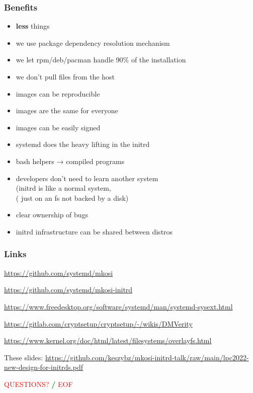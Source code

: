 \documentclass[]{beamer}
\newcommand\pp\pause
\begin{document}
\begin{frame}
  \frametitle{Benefits}

  \begin{itemize}
  \item \textbf{less} things
    \pp
  \item we use package dependency resolution mechanism
    \pp
  \item we let rpm/deb/pacman handle 90\% of the installation
    \pp
  \item we don't pull files from the host
    \pp
  \item images can be reproducible
    \pp
  \item images are the same for everyone
    \pp
  \item images can be easily signed
    \pp
  \item systemd does the heavy lifting in the initrd
    \pp
  \item bash helpers → compiled programs
    \pp
  \item developers don't need to learn another system\\
    (initrd is like a normal system,\\
    \phantom( just on an fs not backed by a disk)
    \pp
  \item clear ownership of bugs
    \pp
  \item initrd infrastructure can be shared between distros
  \end{itemize}
\end{frame}




\begin{frame}[fragile]
  \frametitle{Links}

  \url{https://github.com/systemd/mkosi}

  \url{https://github.com/systemd/mkosi-initrd}

  \url{https://www.freedesktop.org/software/systemd/man/systemd-sysext.html}

  {
    \small
    \url{https://gitlab.com/cryptsetup/cryptsetup/-/wikis/DMVerity}\\
    }

  \url{https://www.kernel.org/doc/html/latest/filesystems/overlayfs.html}

  \quad

  These slides:
  \url{https://github.com/keszybz/mkosi-initrd-talk/raw/main/lpc2022-new-design-for-initrds.pdf}

  \quad
  \pp

  \hfill \textcolor{red}{QUESTIONS?} \textcolor{green}{\bf /} \textcolor{red}{EOF} \hfill{}

\end{frame}
\end{document}
